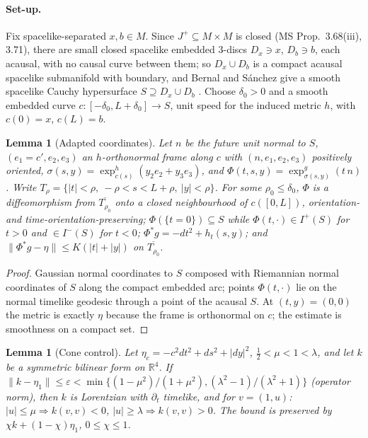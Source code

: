 \documentclass[11pt]{article}
\newtheorem{lemma}[theorem]{Lemma}
\theoremstyle{definition}
\newcommand{\Ifut}{I^{+}}
\newcommand{\Ichr}{I^{-}}
\begin{document}
\paragraph{Set-up.} Fix spacelike-separated $x,b\in M$. Since $J^+\subseteq
M\times M$ is closed (MS Prop.~3.68(iii), 3.71), there are small closed
spacelike embedded $3$-discs $D_x\ni x$, $D_b\ni b$, each acausal, with no causal
curve between them; so $D_x\cup D_b$ is a compact acausal spacelike
submanifold with boundary, and Bernal and Sánchez give a smooth spacelike
Cauchy hypersurface $S\supseteq D_x\cup D_b$ \citep[Thm.~1.1, Rem.~4.14]{BS2006}.
Choose $\delta_0>0$ and a smooth embedded curve $c:[-\delta_0,L+\delta_0]\to S$,
unit speed for the induced metric $h$, with $c(0)=x$, $c(L)=b$.

\begin{lemma}[Adapted coordinates]\label{lem:B}
Let $n$ be the future unit normal to $S$, $(e_1=c',e_2,e_3)$ an $h$-orthonormal
frame along $c$ with $(n,e_1,e_2,e_3)$ positively oriented,
$\sigma(s,y)=\exp^h_{c(s)}(y_2e_2+y_3e_3)$, and
$\Phi(t,s,y)=\exp^g_{\sigma(s,y)}(t\,n)$. Write
$T_\rho=\{|t|<\rho,\ -\rho<s<L+\rho,\ |y|<\rho\}$. For some $\rho_0\le\delta_0$,
$\Phi$ is a diffeomorphism from $\overline{T_{\rho_0}}$ onto a closed
neighbourhood of $c([0,L])$, orientation- and time-orientation-preserving;
$\Phi(\{t=0\})\subseteq S$ while $\Phi(t,\cdot)\in\Ifut(S)$ for $t>0$ and
$\in\Ichr(S)$ for $t<0$; $\Phi^*g=-dt^2+h_t(s,y)$; and
$\|\Phi^*g-\eta\|\le K(|t|+|y|)$ on $\overline{T_{\rho_0}}$.
\end{lemma}

\begin{proof}
Gaussian normal coordinates to $S$ composed with Riemannian normal
coordinates of $S$ along the compact embedded arc; points $\Phi(t,\cdot)$ lie
on the normal timelike geodesic through a point of the acausal $S$. At
$(t,y)=(0,0)$ the metric is exactly $\eta$ because the frame is orthonormal on
$c$; the estimate is smoothness on a compact set.
\end{proof}

\begin{lemma}[Cone control]\label{lem:C}
Let $\eta_c=-c^2dt^2+ds^2+|dy|^2$, $\tfrac12<\mu<1<\lambda$, and let $k$ be a
symmetric bilinear form on $\mathbb R^4$. If
$\|k-\eta_1\|\le\varepsilon<\min\{(1-\mu^2)/(1+\mu^2),(\lambda^2-1)/(\lambda^2+1)\}$
(operator norm), then $k$ is Lorentzian with $\partial_t$ timelike, and for
$v=(1,u)$: $|u|\le\mu\Rightarrow k(v,v)<0$, $|u|\ge\lambda\Rightarrow
k(v,v)>0$. The bound is preserved by $\chi k+(1-\chi)\eta_1$, $0\le\chi\le1$.
\end{lemma}
\end{document}

